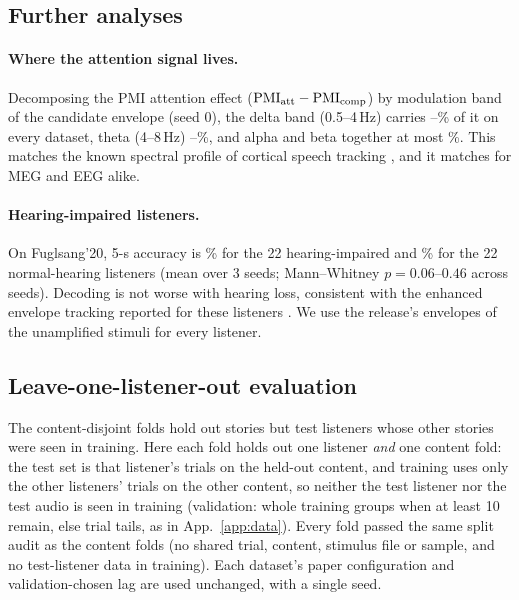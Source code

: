 \documentclass[10pt,twocolumn,letterpaper]{article}
\newcommand{\PMI}{\mathrm{PMI}}
\begin{document}
\FloatBarrier
\subsection{Further analyses}\label{app:further}
\paragraph{Where the attention signal lives.} Decomposing the PMI attention effect
($\PMI_{\rm att}-\PMI_{\rm comp}$) by modulation band of the candidate envelope (seed 0), the delta
band (0.5--4\,Hz) carries \deltaMin--\deltaMax\% of it on every dataset, theta (4--8\,Hz)
\thetaMin--\thetaMax\%, and alpha and beta together at most \abMax\%. This matches the known spectral profile of cortical
speech tracking \citep{ding2012emergence}, and it matches for MEG and EEG alike.

\paragraph{Hearing-impaired listeners.} On Fuglsang'20, 5-s accuracy is \hiAcc\% for the 22
hearing-impaired and \nhAcc\% for the 22 normal-hearing listeners (mean over 3 seeds;
Mann--Whitney $p=0.06$--$0.46$ across seeds). Decoding is not worse with hearing loss,
consistent with the enhanced envelope tracking reported for these listeners
\citep{fuglsang2020effects}. We use the release's envelopes of the unamplified stimuli for every listener.

\FloatBarrier
\subsection{Leave-one-listener-out evaluation}\label{app:loso}
The content-disjoint folds hold out stories but test listeners whose other stories were
seen in training. Here each fold holds out one listener \emph{and} one content fold: the test
set is that listener's trials on the held-out content, and training uses only the other
listeners' trials on the other content, so neither the test listener nor the test audio is
seen in training (validation: whole training groups when at least 10 remain, else trial
tails, as in App.~\ref{app:data}). Every fold passed the same split audit as the content
folds (no shared trial, content, stimulus file or sample, and no test-listener data in
training). Each dataset's paper configuration and validation-chosen lag are used unchanged,
with a single seed.
\end{document}
